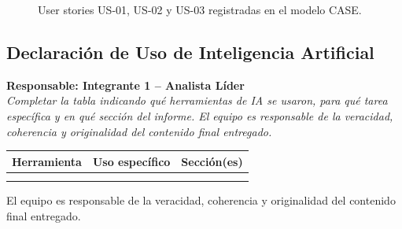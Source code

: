 \documentclass[journal,onecolumn]{IEEEtran}
\newcommand{\guia}[2]{%
  \begin{mdframed}[style=guia]
    \noindent\textbf{Responsable: #1}\\[2pt]
    \textit{#2}
  \end{mdframed}
}
\begin{document}
\begin{figure}[H]
  \centering
  \caption{User stories US-01, US-02 y US-03 registradas en el modelo CASE.}
  \label{fig:us_case}
\end{figure}

\subsection{Declaración de Uso de Inteligencia Artificial}
\label{app:ia}

\guia{Integrante 1 -- Analista Líder}{%
Completar la tabla indicando qué herramientas de IA se usaron,
para qué tarea específica y en qué sección del informe.
El equipo es responsable de la veracidad, coherencia y originalidad
del contenido final entregado.}

\begin{table}[H]
\begin{tabularx}{\textwidth}{|l|X|l|}
\hline
\textbf{Herramienta} & \textbf{Uso específico} & \textbf{Sección(es)} \\
\hline
 &  & \\
\hline
 &  & \\
\hline
\end{tabularx}
\end{table}

\noindent El equipo es responsable de la veracidad, coherencia y
originalidad del contenido final entregado.
\end{document}

